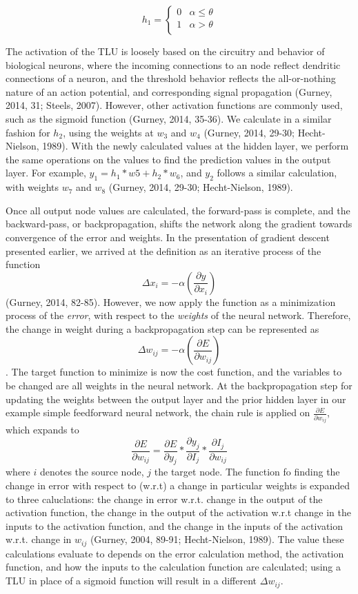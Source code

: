 \documentclass[11pt]{article}
\begin{document}
\[ h_1 = \begin{cases}
	0 & \alpha \leq \theta\\
	1 & \alpha > \theta\\
	\end{cases}
\]

The activation of the TLU is loosely based on the circuitry and behavior of biological neurons, where the incoming connections to an node reflect dendritic connections of a neuron, and the threshold behavior reflects the all-or-nothing nature of an action potential, and corresponding signal propagation (Gurney, 2014, 31; Steels, 2007). However, other activation functions are commonly used, such as the sigmoid function (Gurney, 2014, 35-36). We calculate in a similar fashion for $h_2$, using the weights at $w_3$ and $w_4$ (Gurney, 2014, 29-30; Hecht-Nielson, 1989). With the newly calculated values at the hidden layer, we perform the same operations on the values to find the prediction values in the output layer. For example, $y_1 = h_1*w5 + h_2*w_6$, and $y_2$ follows a similar calculation, with weights $w_7$ and $w_8$ (Gurney, 2014, 29-30; Hecht-Nielson, 1989). \par
Once all output node values are calculated, the forward-pass is complete, and the backward-pass, or backpropagation, shifts the network along the gradient towards convergence of the error and weights. In the presentation of gradient descent presented earlier, we arrived at the definition as an iterative process of the function $$\Delta x_i = -\alpha(\frac{\partial y}{\partial x_i})$$ (Gurney, 2014, 82-85). However, we now apply the function as a minimization process of the \textit{error}, with respect to the \textit{weights} of the neural network. Therefore, the change in weight during a backpropagation step can be represented as $$\Delta w_{ij}= -\alpha(\frac{\partial E}{\partial w_{ij}})$$. The target function to minimize is now the cost function, and the variables to be changed are all weights in the neural network. At the backpropagation step for updating the weights between the output layer and the prior hidden layer in our example simple feedforward neural network, the chain rule is applied on $\frac{\partial E}{\partial w_{ij}} $, which expands to $$\frac{\partial E}{\partial w_{ij}} = \frac{\partial E}{\partial y_j} * \frac{\partial y_j}{\partial I_{j}} * \frac{\partial I_{j}}{\partial w_{ij}}$$ where $i$ denotes the source node, $j$ the target node. The function fo finding the change in error with respect to (w.r.t) a change in particular weights is expanded to three caluclations: the change in error w.r.t. change in the output of the activation function, the change in the output of the activation w.r.t change in the inputs to the activation function, and the change in the inputs of the activation w.r.t. change in $w_{ij}$ (Gurney, 2004, 89-91; Hecht-Nielson, 1989). The value these calculations evaluate to depends on the error calculation method, the activation function, and how the inputs to the calculation function are calculated; using a TLU in place of a sigmoid function will result in a different $\Delta w_{ij}$.\par
\end{document}
